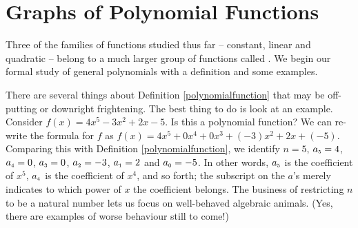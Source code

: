 \section{Graphs of Polynomial Functions}
\label{GraphsofPolynomials}

Three of the families of functions studied thus far -- constant, linear and  quadratic -- belong to a much larger group of functions called .  We begin our formal study of general polynomials with a definition and some examples.

\smallskip


\medskip

There are several things about Definition \ref{polynomialfunction} that may be off-putting or downright frightening.  The best thing to do is look at an example.  Consider $f(x) = 4x^5 - 3x^2 + 2x - 5$.  Is this a polynomial function?  We can re-write the formula for $f$ as $f(x)= 4x^5 + 0 x^{4} + 0 x^{3} + (-3)x^2 + 2 x + (-5).$  Comparing this with Definition \ref{polynomialfunction}, we identify $n=5$, $a_{\mbox{\tiny $5$}} = 4$, $a_{\mbox{\tiny $4$}} = 0$, $a_{\mbox{\tiny $3$}} = 0$, $a_{\mbox{\tiny $2$}} = -3$, $a_{\mbox{\tiny $1$}} = 2$ and $a_{\mbox{\tiny $0$}} = -5$.  In other words, $a_{\mbox{\tiny $5$}}$ is the coefficient of $x^{5}$, $a_{\mbox{\tiny $4$}}$ is the coefficient of $x^{4}$, and so forth;  the subscript on the $a$'s merely indicates to which power of $x$ the coefficient belongs.  The business of restricting $n$ to be a natural number lets us focus on well-behaved algebraic animals. (Yes, there are examples of worse behaviour still to come!)


\medskip


